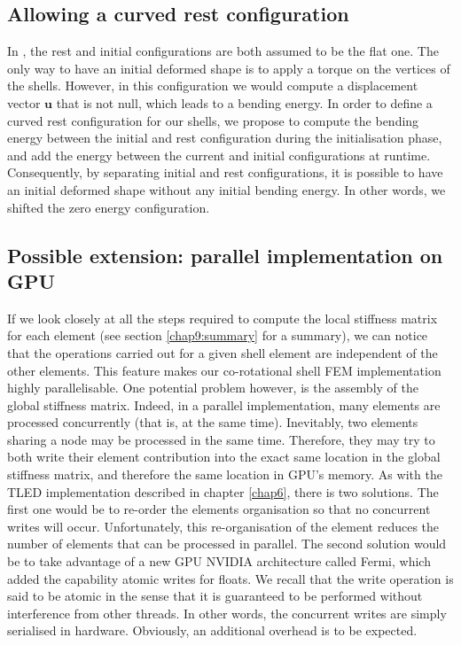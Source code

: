 \subsection{Allowing a curved rest configuration}
In \cite{Przemieniecki85}, the rest and initial configurations are both assumed to be the flat one. The only way to have an initial deformed shape is to apply a torque on the vertices of the shells. However, in this configuration we would compute a displacement vector $ \mathbf{u} $ that is not null, which leads to a bending energy. In order to define a curved rest configuration for our shells, we propose to compute the bending energy between the initial and rest configuration during the initialisation phase, and add the energy between the current and initial configurations at runtime. Consequently, by separating initial and rest configurations, it is possible to have an initial deformed shape without any initial bending energy. In other words, we shifted the zero energy configuration.


\subsection{Possible extension: parallel implementation on GPU}	\label{chap9:GPU}
If we look closely at all the steps required to compute the local stiffness matrix for each element (see section \ref{chap9:summary} for a summary), we can notice that the operations carried out for a given shell element are independent of the other elements. This feature makes our co-rotational shell FEM implementation highly parallelisable. One potential problem however, is the assembly of the global stiffness matrix. Indeed, in a parallel implementation, many elements are processed concurrently (that is, at the same time). Inevitably, two elements sharing a node may be processed in the same time. Therefore, they may try to both write their element contribution into the exact same location in the global stiffness matrix, and therefore the same location in GPU's memory. As with the TLED implementation described in chapter \ref{chap6}, there is two solutions. The first one would be to re-order the elements organisation so that no concurrent writes will occur. Unfortunately, this re-organisation of the element reduces the number of elements that can be processed in parallel. The second solution would be to take advantage of a new GPU NVIDIA architecture called Fermi, which added the capability atomic writes for floats. We recall that the write operation is said to be atomic in the sense that it is guaranteed to be performed without interference from other threads. In other words, the concurrent writes are simply serialised in hardware. Obviously, an additional overhead is to be expected. 


